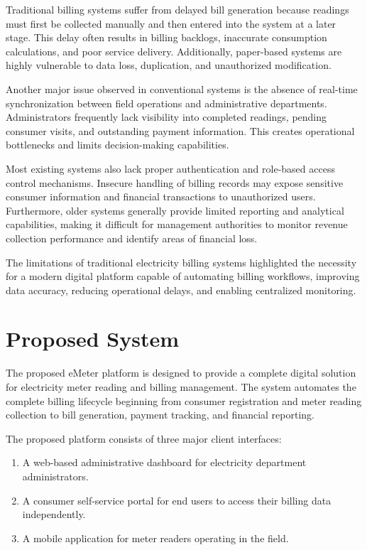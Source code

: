 \documentclass[12pt, a4paper, onecolumn]{report}
\begin{document}
Traditional billing systems suffer from delayed bill generation because readings must first be collected manually and then entered into the system at a later stage. This delay often results in billing backlogs, inaccurate consumption calculations, and poor service delivery. Additionally, paper-based systems are highly vulnerable to data loss, duplication, and unauthorized modification.

Another major issue observed in conventional systems is the absence of real-time synchronization between field operations and administrative departments. Administrators frequently lack visibility into completed readings, pending consumer visits, and outstanding payment information. This creates operational bottlenecks and limits decision-making capabilities.

Most existing systems also lack proper authentication and role-based access control mechanisms. Insecure handling of billing records may expose sensitive consumer information and financial transactions to unauthorized users. Furthermore, older systems generally provide limited reporting and analytical capabilities, making it difficult for management authorities to monitor revenue collection performance and identify areas of financial loss.

The limitations of traditional electricity billing systems highlighted the necessity for a modern digital platform capable of automating billing workflows, improving data accuracy, reducing operational delays, and enabling centralized monitoring.

\section{Proposed System}

The proposed eMeter platform is designed to provide a complete digital solution for electricity meter reading and billing management. The system automates the complete billing lifecycle beginning from consumer registration and meter reading collection to bill generation, payment tracking, and financial reporting.

The proposed platform consists of three major client interfaces:
\begin{enumerate}
    \item A web-based administrative dashboard for electricity department administrators.
    \item A consumer self-service portal for end users to access their billing data independently.
    \item A mobile application for meter readers operating in the field.
\end{enumerate}
\end{document}
